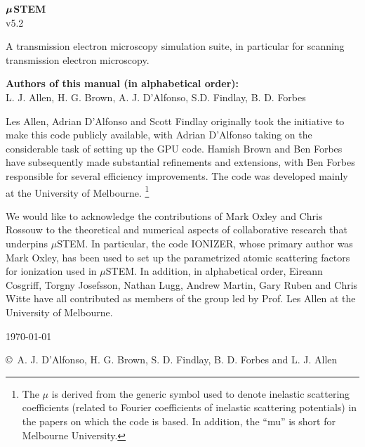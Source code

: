 \documentclass[12pt,a4paper]{article}
\newcommand{\bbox}[1]{{\mbox{\boldmath{$#1$}}}}
\begin{document}


\begin{center}

\vspace*{5mm}

{\Huge{\bf $\bbox{\mu}$STEM}\\ v5.2}\\ 

\vspace{15mm} 

{\Large A transmission electron microscopy simulation suite, in particular for scanning transmission electron microscopy.}\\

\vspace{10mm}

{\bf Authors of this manual (in alphabetical order):}\\
L. J. Allen,  H. G. Brown, A. J. D'Alfonso, S.D. Findlay, B. D. Forbes 

\end{center}


Les Allen, Adrian D'Alfonso and Scott Findlay  originally took the initiative to make this code publicly available, with Adrian D'Alfonso taking on the considerable task of setting up the GPU code. Hamish Brown and Ben Forbes have subsequently made substantial refinements and extensions, with Ben Forbes responsible for several efficiency improvements. The code was developed mainly at the University of Melbourne. \footnote{ The $\mu$ is derived from the generic symbol used to denote inelastic scattering coefficients (related to Fourier coefficients of inelastic scattering potentials) in the papers on which the code is based. In addition, the ``mu'' is short for Melbourne University.}

We would like to acknowledge the contributions of Mark Oxley and Chris Rossouw to the theoretical and numerical aspects of collaborative research that underpins $\mu$STEM.
In particular, the code IONIZER, whose primary author was Mark Oxley, has been used to set up the parametrized atomic scattering factors for ionization used in $\mu$STEM. 
In addition, in alphabetical order, Eireann Cosgriff, Torgny Josefsson, Nathan Lugg, Andrew Martin, Gary Ruben and Chris Witte have all contributed as members of the group led by Prof. Les Allen at the University of Melbourne. 
\begin{center}
\vspace{10mm}

{\today}

\vspace*{5 mm}

{\small \copyright $\,$  A. J. D'Alfonso, H. G. Brown, S. D. Findlay, B. D. Forbes and L. J. Allen}


\end{center}
\end{document}
